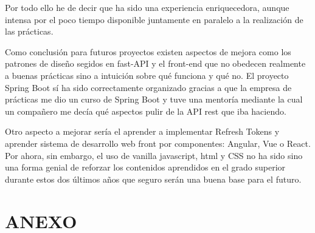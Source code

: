 \documentclass[a4paper,12pt]{report}
\begin{document}
	Por todo ello he de decir que ha sido una experiencia enriquecedora, aunque intensa por el poco tiempo disponible juntamente en paralelo a la realización de las prácticas.
	
	Como conclusión para futuros proyectos existen aspectos de mejora como los patrones de diseño segidos en fast-API y el front-end que no obedecen realmente a buenas prácticas sino a intuición sobre qué funciona y qué no. El proyecto Spring Boot sí ha sido correctamente organizado gracias a que la empresa de prácticas me dio un curso de Spring Boot y tuve una mentoría mediante la cual un compañero me decía qué aspectos pulir de la API rest que iba haciendo.
	
	Otro aspecto a mejorar sería el aprender a implementar Refresh Tokens y aprender sistema de desarrollo web front por componentes: Angular, Vue o React. Por ahora, sin embargo, el uso de vanilla javascript, html y CSS no ha sido sino una forma genial de reforzar los contenidos aprendidos en el grado superior durante estos dos últimos años que seguro serán una buena base para el futuro.
	

	
	
	
	

	
	
	
	
	
	
	
	
	
	
	
	
	
	
	
	
	
	
	
	
	
	
	
	
	
	
	
	
	
	
	
	
	
	
	
	
	
	\begingroup
	\endgroup
	
	
	\chapter{ANEXO}
	\label{chap:anexo} %
		
\end{document}

